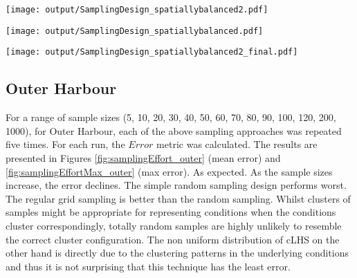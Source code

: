 \documentclass[a4paper]{article}
\let\origfigure=\figure
\let\endorigfigure=\endfigure
\renewenvironment{figure}[1][]{%
   \origfigure[H]
}{%
   \endorigfigure
}
\begin{document}
\begin{figure}
\centering\scriptsize
\texttt{[image: output/SamplingDesign\_spatiallybalanced2.pdf]}
\caption{Sampling configurations associated with the lowest mean Error
for each sample size for nD Spatially balanced sampling for the East
Arm\label{fig:SamplingDesignspatiallybalanced2}}
\end{figure}

\begin{figure}
\centering\scriptsize
\texttt{[image: output/SamplingDesign\_spatiallybalanced.pdf]}
\caption{Sampling configurations associated with the lowest mean Error
for each sample size for 2D Spatially balanced sampling for the East
Arm\label{fig:SamplingDesignspatiallybalanced}}
\end{figure}

\begin{figure}
\centering\scriptsize
\texttt{[image: output/SamplingDesign\_spatiallybalanced2\_final.pdf]}
\caption{Two dimensional spatially balanced sampling configuration for
the East Arm (100
samples)\label{fig:SamplingDesign_spatiallybalanced2_final}}
\end{figure}

\hypertarget{outer-harbour-1}{%
\subsection{Outer Harbour}\label{outer-harbour-1}}

For a range of sample sizes (5, 10, 20, 30, 40, 50, 60, 70, 80, 90, 100,
120, 200, 1000), for Outer Harbour, each of the above sampling
approaches was repeated five times. For each run, the \(Error\) metric
was calculated. The results are presented in Figures
\ref{fig:samplingEffort_outer} (mean error) and
\ref{fig:samplingEffortMax_outer} (max error). As expected. As the
sample sizes increase, the error declines. The simple random sampling
design performs worst. The regular grid sampling is better than the
random sampling. Whilst clusters of samples might be appropriate for
representing conditions when the conditions cluster correspondingly,
totally random samples are highly unlikely to resemble the correct
cluster configuration. The non uniform distribution of cLHS on the other
hand is directly due to the clustering patterns in the underlying
conditions and thus it is not surprising that this technique has the
least error.
\end{document}
